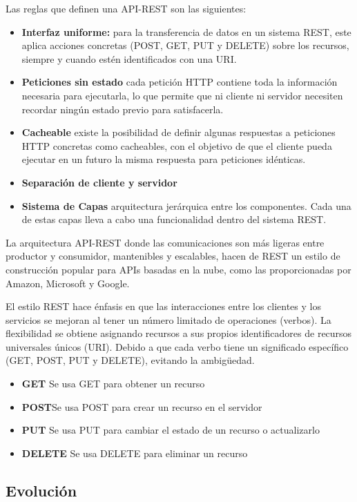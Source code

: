 Las reglas que definen una API-REST son las siguientes:
\begin{itemize}
    \item \textbf {Interfaz uniforme: } para la transferencia de datos en un sistema REST, este aplica acciones concretas (POST, GET, PUT y DELETE) sobre los recursos, siempre y cuando estén identificados con una URI.
    \item \textbf {Peticiones sin estado} cada petición HTTP contiene toda la información necesaria para ejecutarla, lo que permite que ni cliente ni servidor necesiten recordar ningún estado previo para satisfacerla.
    \item \textbf {Cacheable} existe la posibilidad de definir algunas respuestas a peticiones HTTP concretas como cacheables, con el objetivo de que el cliente pueda ejecutar en un futuro la misma respuesta para peticiones idénticas. 
    \item \textbf {Separación de cliente y servidor} 
    \item \textbf {Sistema de Capas} arquitectura jerárquica entre los componentes. Cada una de estas capas lleva a cabo una funcionalidad dentro del sistema REST.
\end{itemize}

La arquitectura API-REST donde las comunicaciones son más ligeras entre productor y consumidor, mantenibles y escalables, hacen de REST un estilo de construcción popular para APIs basadas en la nube, como las proporcionadas por Amazon, Microsoft y Google.

El estilo REST hace énfasis en que las interacciones entre los clientes y los servicios se mejoran al tener un número limitado de operaciones (verbos). La flexibilidad se obtiene asignando recursos a sus propios identificadores de recursos universales únicos (URI). Debido a que cada verbo tiene un significado específico (GET, POST, PUT y DELETE), evitando la ambigüedad.
\begin{itemize}
    \item \textbf {GET} Se usa GET para obtener un recurso
    \item \textbf {POST}Se usa POST para crear un recurso en el servidor
    \item \textbf {PUT} Se usa PUT para cambiar el estado de un recurso o actualizarlo
    \item \textbf {DELETE} Se usa DELETE para eliminar un recurso
\end{itemize}


\subsection*{Evolución}

